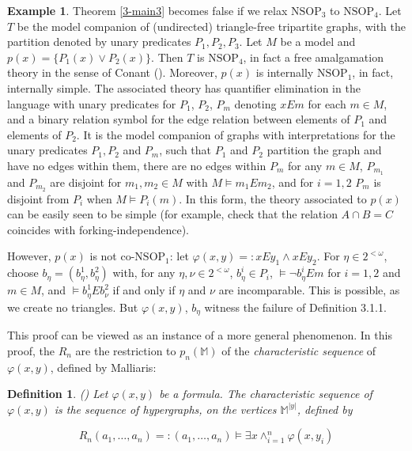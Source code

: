 \documentclass[12pt]{amsart}
\newtheorem{definition}{Definition}[section]
\theoremstyle{definition}
\newtheorem{example}[theorem]{Example}
\begin{document}
\begin{example}\label{4-example3}
    Theorem \ref{3-main3} becomes false if we relax $\mathrm{NSOP}_{3}$ to $\mathrm{NSOP}_{4}$. Let $T$ be the model companion of (undirected) triangle-free tripartite graphs, with the partition denoted by unary predicates $P_{1}, P_{2}, P_{3}$. Let $M$ be a model and $p(x) = \{P_{1}(x) \vee P_{2}(x)\}$. Then $T$ is $\mathrm{NSOP}_{4}$, in fact a free amalgamation theory in the sense of Conant (\cite{Co15}). Moreover, $p(x)$ is internally $\mathrm{NSOP}_{1}$, in fact, internally simple. The associated theory has quantifier elimination in the language with unary predicates for $P_{1}$, $P_{2}$, $P_{m}$ denoting $x E m$ for each $m \in M$, and a binary relation symbol for the edge relation between elements of $P_{1}$ and elements of $P_{2}$. It is the model companion of graphs with interpretations for the unary predicates $P_{1}, P_{2}$ and $P_{m}$, such that $P_{1}$ and $P_{2}$ partition the graph and have no edges within them, there are no edges within $P_{m}$ for any $m \in M$, $P_{m_{1}}$ and $P_{m_{2}}$ are disjoint for $m_{1}, m_{2} \in M$ with $M \models m_{1} E m_{2}$, and for $i = 1, 2$ $P_{m}$ is disjoint from $P_{i}$ when $M \models P_{i} (m)$. In this form, the theory associated to $p(x)$ can be easily seen to be simple (for example, check that the relation $A \cap B = C$ coincides with forking-independence).
    
    However, $p(x)$ is not co-$\mathrm{NSOP}_{1}$: let $\varphi(x, y) =: xEy_{1} \wedge x E y_{2}$. For $\eta \in 2^{<\omega}$, choose $b_{\eta} = (b^{1}_{\eta}, b^{2}_{\eta})$ with, for any $\eta, \nu \in 2^{< \omega}$, $b^{i}_{\eta} \in P_{i}$, $\models \neg b^{i}_{\eta} E m$ for $i = 1, 2$ and $m \in M$, and $ \models b^{1}_{\eta} E b^{2}_{\nu}$ if and only if $\eta$ and $\nu$ are incomparable. This is possible, as we create no triangles. But $\varphi(x, y)$, $b_{\eta}$ witness the failure of Definition 3.1.1.
\end{example}

This proof can be viewed as an instance of a more general phenomenon. In this proof, the $R_{n}$ are the restriction to $p_{n}(\mathbb{M})$ of the \textit{characteristic sequence} of $\varphi(x, y)$, defined by Malliaris:

\begin{definition}(\cite{Mal10})
   Let $\varphi(x, y)$ be a formula. The \emph{characteristic sequence} of $\varphi(x, y)$ is the sequence of hypergraphs, on the vertices $\mathbb{M}^{|y|}$, defined by

   $$R_{n}(a_{1}, \ldots, a_{n}) =: (a_{1}, \ldots, a_{n}) \models \exists x \wedge_{i=1}^{n}\varphi(x, y_{i})$$
\end{definition}
\end{document}
